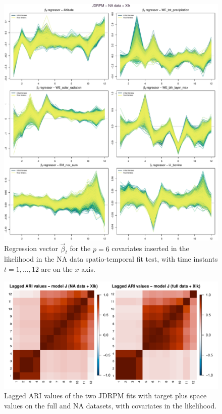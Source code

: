 \documentclass[12pt,	%
	a4paper,		%
	twoside,		%
	openright,		%
	titlepage,%
	]{book}
\theoremstyle{definition}
\begin{document}
\begin{figure}[!ht]
    \centering
    \includegraphics[width=1\linewidth]{Testing/Covariates/NA lk improvement/beta_allsJDRPM - NA data + Xlk.pdf}
    \caption[Regression vector of the fit with multiple covariates in the likelihood, NA dataset]{Regression vector $\vec{\beta}_t$ for the $p=6$ covariates inserted in the likelihood in the NA data spatio-temporal fit test, with time instants $t=1,\ldots,12$ are on the $x$ axis.}
    \label{fig: lk regressor altitude and friends NA}
\end{figure}
\begin{figure}[H]
    \centering
    \includegraphics[width=1\linewidth]{Testing/Covariates/NA lk improvement/ari.pdf}
    \caption[Lagged ARI values of JDRPM fit, target plus space values, full vs NA dataset, with covariates in the likelihood]{Lagged ARI values of the two JDRPM fits with target plus space values on the full and NA datasets, with covariates in the likelihood.}
    \label{fig:ari xlk}
\end{figure}
\end{document}
